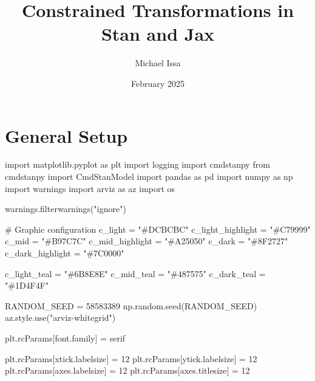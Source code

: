 \documentclass[
  letterpaper,
  DIV=11,
  numbers=noendperiod]{scrartcl}
\title{Constrained Transformations in Stan and Jax}
\author{Michael Issa}
\date{February 2025}
\newenvironment{Shaded}{\begin{snugshade}}{\end{snugshade}}
\newcommand{\CommentTok}[1]{\textcolor[rgb]{0.37,0.37,0.37}{#1}}
\newcommand{\DecValTok}[1]{\textcolor[rgb]{0.68,0.00,0.00}{#1}}
\newcommand{\ImportTok}[1]{\textcolor[rgb]{0.00,0.46,0.62}{#1}}
\newcommand{\NormalTok}[1]{\textcolor[rgb]{0.00,0.23,0.31}{#1}}
\newcommand{\OperatorTok}[1]{\textcolor[rgb]{0.37,0.37,0.37}{#1}}
\newcommand{\StringTok}[1]{\textcolor[rgb]{0.13,0.47,0.30}{#1}}
\renewcommand*\contentsname{Table of contents}
\newcommand\contentsname{Table of contents}
\begin{document}
\maketitle

\renewcommand*\contentsname{Table of contents}
{
\hypersetup{linkcolor=}
\setcounter{tocdepth}{3}
\tableofcontents
}

\section{General Setup}\label{general-setup}

\begin{Shaded}
\begin{Highlighting}[]
\ImportTok{import}\NormalTok{ matplotlib.pyplot }\ImportTok{as}\NormalTok{ plt}
\ImportTok{import}\NormalTok{ logging}
\ImportTok{import}\NormalTok{ cmdstanpy}
\ImportTok{from}\NormalTok{ cmdstanpy }\ImportTok{import}\NormalTok{ CmdStanModel}
\ImportTok{import}\NormalTok{ pandas }\ImportTok{as}\NormalTok{ pd}
\ImportTok{import}\NormalTok{ numpy }\ImportTok{as}\NormalTok{ np}
\ImportTok{import}\NormalTok{ warnings}
\ImportTok{import}\NormalTok{ arviz }\ImportTok{as}\NormalTok{ az}
\ImportTok{import}\NormalTok{ os}

\NormalTok{warnings.filterwarnings(}\StringTok{"ignore"}\NormalTok{)}

\CommentTok{\# Graphic configuration}
\NormalTok{c\_light }\OperatorTok{=} \StringTok{"\#DCBCBC"}
\NormalTok{c\_light\_highlight }\OperatorTok{=} \StringTok{"\#C79999"}
\NormalTok{c\_mid }\OperatorTok{=} \StringTok{"\#B97C7C"}
\NormalTok{c\_mid\_highlight }\OperatorTok{=} \StringTok{"\#A25050"}
\NormalTok{c\_dark }\OperatorTok{=} \StringTok{"\#8F2727"}
\NormalTok{c\_dark\_highlight }\OperatorTok{=} \StringTok{"\#7C0000"}

\NormalTok{c\_light\_teal }\OperatorTok{=} \StringTok{"\#6B8E8E"}
\NormalTok{c\_mid\_teal }\OperatorTok{=} \StringTok{"\#487575"}
\NormalTok{c\_dark\_teal }\OperatorTok{=} \StringTok{"\#1D4F4F"}

\NormalTok{RANDOM\_SEED }\OperatorTok{=} \DecValTok{58583389}
\NormalTok{np.random.seed(RANDOM\_SEED)}
\NormalTok{az.style.use(}\StringTok{"arviz{-}whitegrid"}\NormalTok{)}

\NormalTok{plt.rcParams[}\StringTok{\textquotesingle{}font.family\textquotesingle{}}\NormalTok{] }\OperatorTok{=} \StringTok{\textquotesingle{}serif\textquotesingle{}}

\NormalTok{plt.rcParams[}\StringTok{\textquotesingle{}xtick.labelsize\textquotesingle{}}\NormalTok{] }\OperatorTok{=} \DecValTok{12}
\NormalTok{plt.rcParams[}\StringTok{\textquotesingle{}ytick.labelsize\textquotesingle{}}\NormalTok{] }\OperatorTok{=} \DecValTok{12}
\NormalTok{plt.rcParams[}\StringTok{\textquotesingle{}axes.labelsize\textquotesingle{}}\NormalTok{] }\OperatorTok{=} \DecValTok{12}
\NormalTok{plt.rcParams[}\StringTok{\textquotesingle{}axes.titlesize\textquotesingle{}}\NormalTok{] }\OperatorTok{=} \DecValTok{12}


\end{Highlighting}
\end{Shaded}
\end{document}
